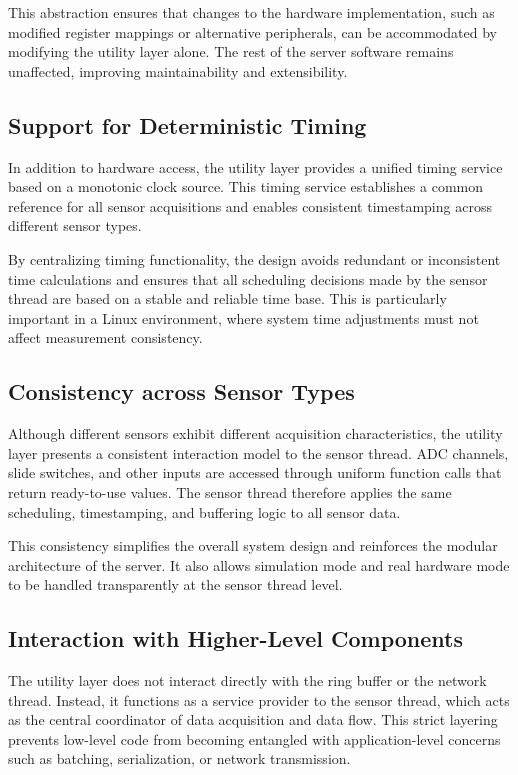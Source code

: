This abstraction ensures that changes to the hardware implementation, such as modified register mappings or alternative peripherals, can be accommodated by modifying the utility layer alone. The rest of the server software remains unaffected, improving maintainability and extensibility.

\subsection{Support for Deterministic Timing}
In addition to hardware access, the utility layer provides a unified timing service based on a monotonic clock source. This timing service establishes a common reference for all sensor acquisitions and enables consistent timestamping across different sensor types.

By centralizing timing functionality, the design avoids redundant or inconsistent time calculations and ensures that all scheduling decisions made by the sensor thread are based on a stable and reliable time base. This is particularly important in a Linux environment, where system time adjustments must not affect measurement consistency.

\subsection{Consistency across Sensor Types}
Although different sensors exhibit different acquisition characteristics, the utility layer presents a consistent interaction model to the sensor thread. ADC channels, slide switches, and other inputs are accessed through uniform function calls that return ready-to-use values. The sensor thread therefore applies the same scheduling, timestamping, and buffering logic to all sensor data.

This consistency simplifies the overall system design and reinforces the modular architecture of the server. It also allows simulation mode and real hardware mode to be handled transparently at the sensor thread level.

\subsection{Interaction with Higher-Level Components}
The utility layer does not interact directly with the ring buffer or the network thread. Instead, it functions as a service provider to the sensor thread, which acts as the central coordinator of data acquisition and data flow. This strict layering prevents low-level code from becoming entangled with application-level concerns such as batching, serialization, or network transmission.

